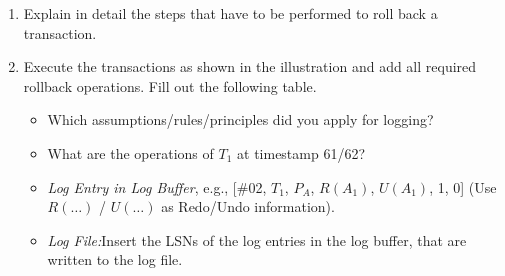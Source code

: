\begin{enumerate}
  \item Explain in detail the steps that have to be performed to roll back a transaction.

  \item{Execute the transactions as shown in the illustration and add all required rollback operations. Fill out the following table.}

        \begin{itemize}
          \item Which assumptions/rules/principles did you apply for logging?
          \item What are the operations of $T_1$ at timestamp 61/62?

          \item \emph{Log Entry in Log Buffer}, e.g., [\#02,  $T_1$,    $P_A$,    $R(A_1)$,   $U(A_1)$,       1, 0] (Use $R(\dots)$ / $U(\dots)$ as Redo/Undo information).
          \item \emph{Log File:}Insert the LSNs of the log entries in the log buffer, that are written to the log file.
        \end{itemize}

\end{enumerate}

\newpage

